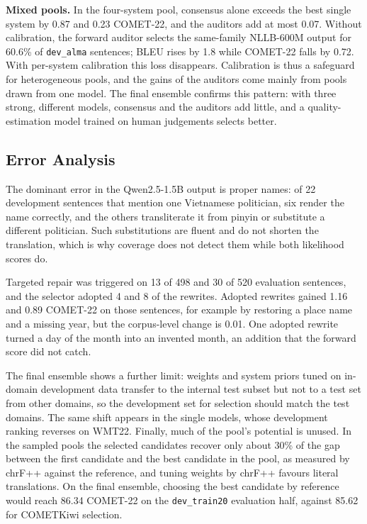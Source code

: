 \documentclass[11pt]{article}
\begin{document}
\textbf{Mixed pools.} In the four-system pool, consensus alone exceeds the best single system by 0.87 and 0.23 COMET-22, and the auditors add at most 0.07. Without calibration, the forward auditor selects the same-family NLLB-600M output for 60.6\% of \texttt{dev\_alma} sentences; BLEU rises by 1.8 while COMET-22 falls by 0.72. With per-system calibration this loss disappears. Calibration is thus a safeguard for heterogeneous pools, and the gains of the auditors come mainly from pools drawn from one model. The final ensemble confirms this pattern: with three strong, different models, consensus and the auditors add little, and a quality-estimation model trained on human judgements selects better.

\subsection{Error Analysis}
\label{subsec:error_analysis}
The dominant error in the Qwen2.5-1.5B output is proper names: of 22 development sentences that mention one Vietnamese politician, six render the name correctly, and the others transliterate it from pinyin or substitute a different politician. Such substitutions are fluent and do not shorten the translation, which is why coverage does not detect them while both likelihood scores do.

Targeted repair was triggered on 13 of 498 and 30 of 520 evaluation sentences, and the selector adopted 4 and 8 of the rewrites. Adopted rewrites gained 1.16 and 0.89 COMET-22 on those sentences, for example by restoring a place name and a missing year, but the corpus-level change is 0.01. One adopted rewrite turned a day of the month into an invented month, an addition that the forward score did not catch.

The final ensemble shows a further limit: weights and system priors tuned on in-domain development data transfer to the internal test subset but not to a test set from other domains, so the development set for selection should match the test domains. The same shift appears in the single models, whose development ranking reverses on WMT22. Finally, much of the pool's potential is unused. In the sampled pools the selected candidates recover only about 30\% of the gap between the first candidate and the best candidate in the pool, as measured by chrF++ against the reference, and tuning weights by chrF++ favours literal translations. On the final ensemble, choosing the best candidate by reference would reach 86.34 COMET-22 on the \texttt{dev\_train20} evaluation half, against 85.62 for COMETKiwi selection.
\end{document}
